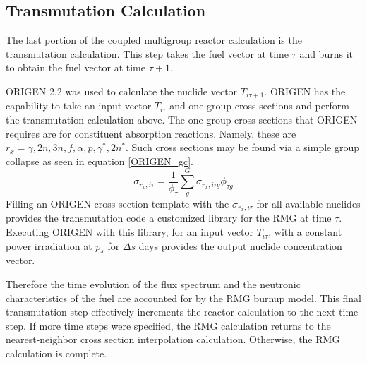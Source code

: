 \subsection{Transmutation Calculation}
\label{mg_sec:trans_calc}
The last portion of the coupled multigroup reactor calculation is the transmutation calculation.
This step takes the fuel vector at time $\tau$ and burns it to obtain the fuel vector at time $\tau+1$.

ORIGEN 2.2 \cite{Croff2002} was used 
to calculate the nuclide vector $T_{i\tau+1}$.  ORIGEN has the capability to take an input vector 
$T_{i\tau}$ and one-group cross sections and perform the transmutation calculation above.  The one-group 
cross sections that ORIGEN requires are for constituent absorption reactions.  Namely, these are 
$r_x = \gamma, 2n, 3n, f, \alpha, p, \gamma^*, 2n^*$.  Such cross sections may be found via 
a simple group collapse as seen in equation \ref{ORIGEN_gc}.
\begin{equation}
\label{ORIGEN_gc}
\sigma_{r_x,i\tau} = \frac{1}{\phi_{\tau}} \sum_g^G \sigma_{r_x,i\tau g} \phi_{\tau g}
\end{equation}
Filling an ORIGEN cross section template with the $\sigma_{r_x,i\tau}$ for all available nuclides
provides the transmutation code a customized library for the RMG at time $\tau$.  Executing ORIGEN
with this library, for an input vector $T_{i\tau}$, with a constant power irradiation at $p_s$ for
$\Delta s$ days provides the output nuclide concentration vector.

Therefore the
time evolution of the flux spectrum and the neutronic characteristics of the fuel are accounted
for by the RMG burnup model.  This final transmutation step effectively increments the reactor
calculation to the next time step.  If more time steps were specified, the RMG calculation returns
to the nearest-neighbor cross section interpolation calculation.  Otherwise, the RMG calculation is
complete.



